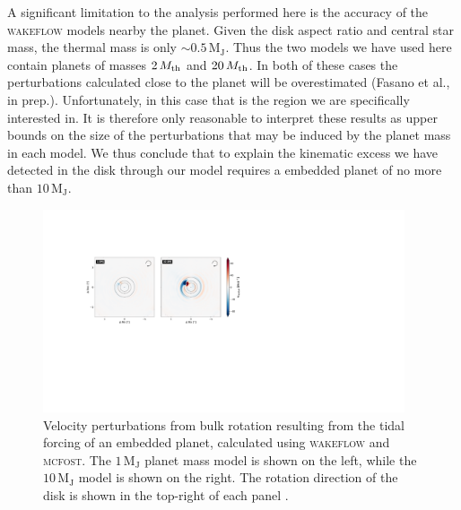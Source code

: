 A significant limitation to the analysis performed here is the accuracy of the \textsc{wakeflow} models nearby the planet.
Given the disk aspect ratio and central star mass, the thermal mass is only $\sim 0.5 \, \mathrm{M_J}$.
Thus the two models we have used here contain planets of masses $2 \, M_{\rm th}$ and $20 \, M_{\rm th}$.
In both of these cases the perturbations calculated close to the planet will be overestimated (Fasano et al., in prep.).
Unfortunately, in this case that is the region we are specifically interested in.
It is therefore only reasonable to interpret these results as upper bounds on the size of the perturbations that may be induced by the planet mass in each model.
We thus conclude that to explain the kinematic excess we have detected in the disk through our model requires a embedded planet of no more than $10 \, \mathrm{M_J}$.
\begin{figure}
    \centering
    \includegraphics[width = 0.95\textwidth]{figures/garg_analytics_cw.pdf}
    \caption{Velocity perturbations from bulk rotation resulting from the tidal forcing of an embedded planet, calculated using \textsc{wakeflow} and \textsc{mcfost}. The $1 \, \mathrm{M_J}$ planet mass model is shown on the left, while the $10 \, \mathrm{M_J}$ model is shown on the right. The rotation direction of the disk is shown in the top-right of each panel \citep{garg2022}.}
    \label{fig:garg_analytics}
\end{figure}

